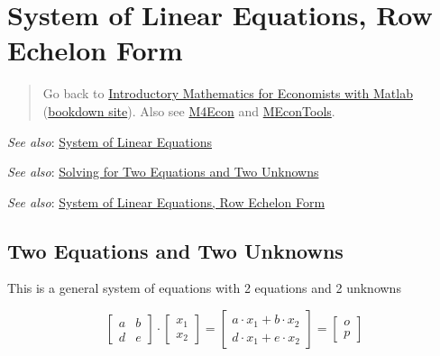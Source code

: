 \documentclass[
]{book}
\begin{document}
\hypertarget{system-of-linear-equations-row-echelon-form}{%
\section{System of Linear Equations, Row Echelon Form}\label{system-of-linear-equations-row-echelon-form}}

\begin{quote}
Go back to \href{https://math4econ.github.io/}{Introductory Mathematics for Economists with Matlab} (\href{https://math4econ.github.io/bookdown}{bookdown site}). Also see \href{http://fanwangecon.github.io/M4Econ}{M4Econ} and \href{https://fanwangecon.github.io/MEconTools/}{MEconTools}.
\end{quote}

\emph{See also}: \href{https://math4econ.github.io/matrix_system_of_equations/matrix_linear_equations.html}{System of Linear
Equations}

\emph{See also}: \href{https://math4econ.github.io/matrix_system_of_equations/matrix_linear_system_2.html}{Solving for Two Equations and Two
Unknowns}

\emph{See also}: \href{https://math4econ.github.io/matrix_system_of_equations/matrix_row_echelon_form.html}{System of Linear Equations, Row Echelon
Form}

\hypertarget{two-equations-and-two-unknowns}{%
\subsection{Two Equations and Two Unknowns}\label{two-equations-and-two-unknowns}}

This is a general system of equations with 2 equations and 2 unknowns

\[\left\lbrack \begin{array}{cc}
a & b\\
d & e
\end{array}\right\rbrack \cdot \left\lbrack \begin{array}{c}
x_1 \\
x_2 
\end{array}\right\rbrack =\left\lbrack \begin{array}{cc}
a\cdot x_1 +b\cdot x_2 \\
d\cdot x_1 +e\cdot x_2 
\end{array}\right\rbrack =\left\lbrack \begin{array}{c}
o\\
p
\end{array}\right\rbrack\]
\end{document}

